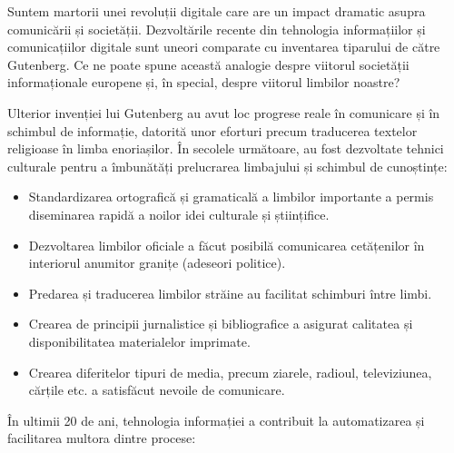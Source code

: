 \begin{multicols}{2}
Suntem martorii unei revoluții digitale care are un impact dramatic asupra comunicării și societății. Dezvoltările recente din tehnologia informațiilor și comunicațiilor digitale sunt uneori comparate cu inventarea tiparului de către Gutenberg. Ce ne poate spune această analogie despre viitorul societății informaționale europene și, în special, despre viitorul limbilor noastre?


Ulterior invenției lui Gutenberg au avut loc progrese reale în comunicare și în schimbul de informație, datorită unor eforturi precum traducerea textelor religioase în limba enoriașilor. În secolele următoare, au fost dezvoltate tehnici culturale pentru a îmbunătăți prelucrarea limbajului și schimbul de cunoștințe:

\medskip
\begin{itemize}
\item Standardizarea ortografică și gramaticală a limbilor importante a permis diseminarea rapidă a noilor idei culturale și științifice.
\item Dezvoltarea limbilor oficiale a făcut posibilă comunicarea cetățenilor în interiorul anumitor granițe (adeseori politice).
\item Predarea și traducerea limbilor străine au facilitat schimburi între limbi.
\item Crearea de principii jurnalistice și bibliografice a asigurat calitatea și disponibilitatea materialelor imprimate.
\medskip
\item Crearea diferitelor tipuri de media, precum ziarele, radioul, televiziunea, cărțile etc. a satisfăcut nevoile de comunicare.
\end{itemize}

În ultimii 20 de ani, tehnologia informației a contribuit la automatizarea și facilitarea multora dintre procese:


\end{multicols}
